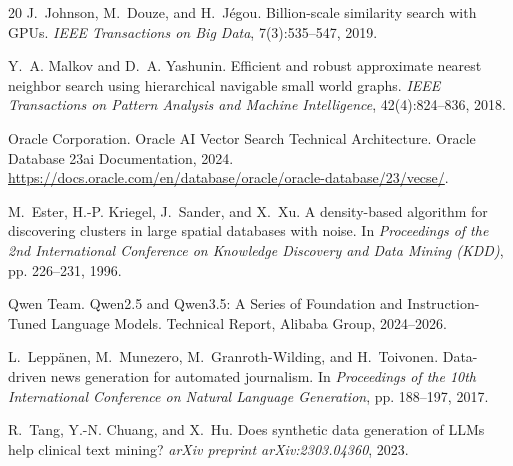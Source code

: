 \documentclass[11pt,a4paper]{article}
\begin{document}
\begin{thebibliography}{20}
J.~Johnson, M.~Douze, and H.~J\'{e}gou.
\newblock Billion-scale similarity search with GPUs.
\newblock \emph{IEEE Transactions on Big Data}, 7(3):535--547, 2019.

Y.~A. Malkov and D.~A. Yashunin.
\newblock Efficient and robust approximate nearest neighbor search using hierarchical navigable small world graphs.
\newblock \emph{IEEE Transactions on Pattern Analysis and Machine Intelligence}, 42(4):824--836, 2018.

Oracle Corporation.
\newblock Oracle AI Vector Search Technical Architecture.
\newblock Oracle Database 23ai Documentation, 2024.
\newblock \url{https://docs.oracle.com/en/database/oracle/oracle-database/23/vecse/}.

M.~Ester, H.-P. Kriegel, J.~Sander, and X.~Xu.
\newblock A density-based algorithm for discovering clusters in large spatial databases with noise.
\newblock In \emph{Proceedings of the 2nd International Conference on Knowledge Discovery and Data Mining (KDD)}, pp. 226--231, 1996.

Qwen Team.
\newblock Qwen2.5 and Qwen3.5: A Series of Foundation and Instruction-Tuned Language Models.
\newblock Technical Report, Alibaba Group, 2024--2026.

L.~Lepp\"{a}nen, M.~Munezero, M.~Granroth-Wilding, and H.~Toivonen.
\newblock Data-driven news generation for automated journalism.
\newblock In \emph{Proceedings of the 10th International Conference on Natural Language Generation}, pp. 188--197, 2017.

R.~Tang, Y.-N. Chuang, and X.~Hu.
\newblock Does synthetic data generation of LLMs help clinical text mining?
\newblock \emph{arXiv preprint arXiv:2303.04360}, 2023.

\end{thebibliography}
\end{document}
